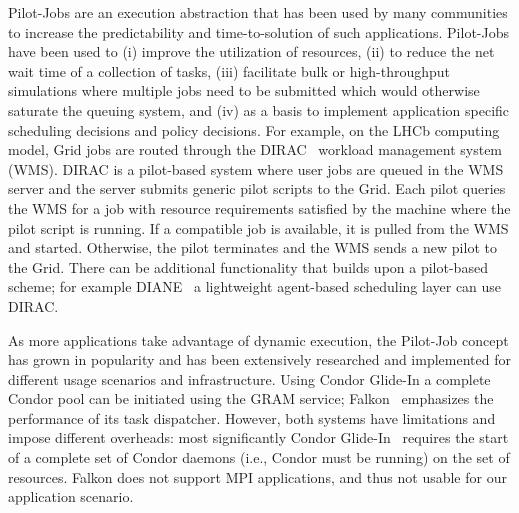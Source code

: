 \documentclass[conference,final]{IEEEtran}
\begin{document}
Pilot-Jobs are an execution abstraction that has been used by many
communities to increase the predictability and time-to-solution of
such applications.  Pilot-Jobs have been used to (i) improve the
utilization of resources, (ii) to reduce the net wait time of a
collection of tasks, (iii) facilitate bulk or high-throughput
simulations where multiple jobs need to be submitted which would
otherwise saturate the queuing system, and (iv) as a basis to
implement application specific scheduling decisions and policy
decisions.  For example, on the LHCb computing model, Grid jobs are
routed through the DIRAC~\cite{dirac} workload management system
(WMS). DIRAC is a pilot-based system where user jobs are queued in the
WMS server and the server submits generic pilot scripts to the
Grid. Each pilot queries the WMS for a job with resource requirements
satisfied by the machine where the pilot script is running. If a
compatible job is available, it is pulled from the WMS and
started. Otherwise, the pilot terminates and the WMS sends a new pilot
to the Grid.  There can be additional functionality that builds upon a
pilot-based scheme; for example DIANE~\cite{diane} a lightweight
agent-based scheduling layer can use DIRAC.


As more applications take advantage of dynamic execution, the
Pilot-Job concept has grown in popularity and has been extensively
researched and implemented for different usage scenarios and
infrastructure. %
Using Condor Glide-In a complete Condor pool can be initiated using
the GRAM service; Falkon~\cite{1362680} emphasizes the performance of
its task dispatcher. However, both systems have limitations and impose
different overheads: most significantly Condor
Glide-In~\cite{citeulike:291860} requires the start of a complete set
of Condor daemons (i.e., Condor must be running) on the
set of resources. Falkon does not support MPI applications, and thus
not usable for our application scenario.
\end{document}
